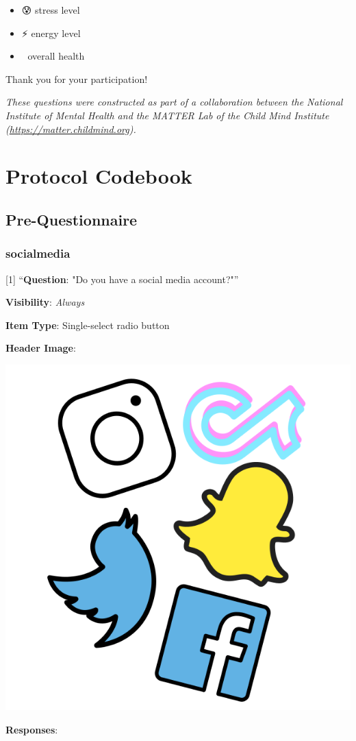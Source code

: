 \documentclass[]{book}
\providecommand{\tightlist}{%
  \setlength{\itemsep}{0pt}\setlength{\parskip}{0pt}}
\begin{document}
\begin{itemize}
\tightlist
\item
  😰 stress level
\item
  ⚡️ energy level
\item
  🏥 overall health
\end{itemize}

Thank you for your participation!

\emph{These questions were constructed as part of a collaboration between the National Institute of Mental Health and the MATTER Lab of the Child Mind Institute (\url{https://matter.childmind.org}).}

\hypertarget{part-protocol-codebook}{%
\part{Protocol Codebook}\label{part-protocol-codebook}}

\hypertarget{pre_section}{%
\chapter{Pre-Questionnaire}\label{pre_section}}

\hypertarget{socialmedia}{%
\section{socialmedia}\label{socialmedia}}

{[}1{]} ``\textbf{Question}: "Do you have a social media account?"''

\textbf{Visibility}: \emph{Always}

\textbf{Item Type}: Single-select radio button

\textbf{Header Image}:

\begin{flushleft}\includegraphics[width=0.33\linewidth]{downloadFigs4latex_NIMH_Applet_Codebook/socialmedia_headerImg} \end{flushleft}

\textbf{Responses}:
\end{document}
